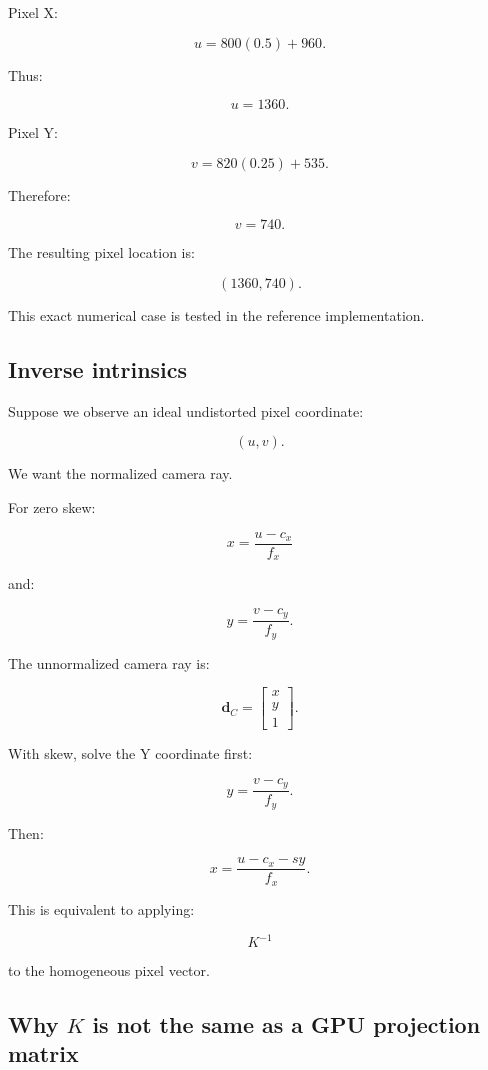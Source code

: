 Pixel X:

\[
 u=800(0.5)+960.
\]

Thus:

\[
 \boxed{u=1360}.
\]

Pixel Y:

\[
 v=820(0.25)+535.
\]

Therefore:

\[
 \boxed{v=740}.
\]

The resulting pixel location is:

\[
 \boxed{(1360,740)}.
\]

This exact numerical case is tested in the reference implementation.

\subsection{Inverse intrinsics}\label{02-foundations-ii-ch034-inverse-intrinsics}

Suppose we observe an ideal undistorted pixel coordinate:

\[
 (u,v).
\]

We want the normalized camera ray.

For zero skew:

\[
 \boxed{ x=\frac{u-c_x}{f_x} }
\]

and:

\[
 \boxed{ y=\frac{v-c_y}{f_y} }.
\]

The unnormalized camera ray is:

\[
 \boxed{ \mathbf d_C= \begin{bmatrix} x\\y\\1 \end{bmatrix} }.
\]

With skew, solve the Y coordinate first:

\[
 y=\frac{v-c_y}{f_y}.
\]

Then:

\[
 \boxed{ x=\frac{u-c_x-sy}{f_x} }.
\]

This is equivalent to applying:

\[
 K^{-1}
\]

to the homogeneous pixel vector.

\subsection{\texorpdfstring{Why \(K\) is not the same as a GPU projection matrix}{Why K is not the same as a GPU projection matrix}}\label{02-foundations-ii-ch034-why-k-is-not-the-same-as-a-gpu-projection-matrix}


